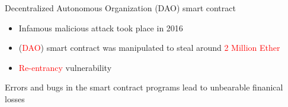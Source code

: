 \documentclass[aspectratio=169]{beamer}
\begin{document}
\begin{frame}{Decentralized Autonomous Organization (DAO) smart contract}

 \begin{itemize}
\item Infamous malicious attack took place in 2016 
\item (\textcolor{red}{DAO}) smart contract was manipulated to steal around \textcolor{red}{2 Million Ether}
\item \textcolor{red}{Re-entrancy} vulnerability
\end{itemize}
\vspace{0.5in}
\begin{exampleblock}{}
  {\large \begin{center}Errors and bugs in the smart contract programs lead to unbearable finanical losses \end{center}}
\end{exampleblock}
\end{frame}
\end{document}
